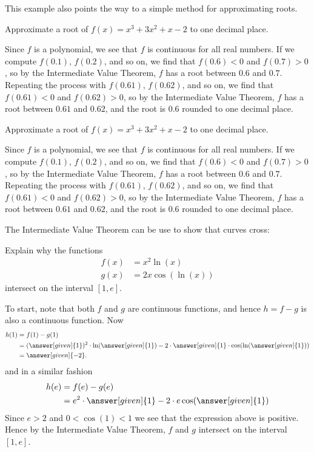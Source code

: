 \documentclass{ximera}
\begin{document}
This example also points the way to a simple method for approximating
roots. 

\begin{example} 
Approximate a root of $f(x) =x^3 + 3x^2+x-2$ to one decimal place.



Since $f$ is a polynomial, we see that $f$ is continuous for all real
numbers. If we compute $f(0.1)$, $f(0.2)$, and so on, we find that
$f(0.6)<0$ and $f(0.7)>0$, so by the Intermediate Value Theorem, $f$
has a root between $0.6$ and $0.7$. Repeating the process with
$f(0.61)$, $f(0.62)$, and so on, we find that $f(0.61)<0$ and
$f(0.62)>0$, so by the Intermediate Value Theorem, $f$ has a root between $0.61$ and
$0.62$, and the root is $0.6$ rounded to one decimal place.
\end{example}


\begin{example} 
Approximate a root of $f(x) =x^3 + 3x^2+x-2$ to one decimal place.



Since $f$ is a polynomial, we see that $f$ is continuous for all real
numbers. If we compute $f(0.1)$, $f(0.2)$, and so on, we find that
$f(0.6)<0$ and $f(0.7)>0$, so by the Intermediate Value Theorem, $f$
has a root between $0.6$ and $0.7$. Repeating the process with
$f(0.61)$, $f(0.62)$, and so on, we find that $f(0.61)<0$ and
$f(0.62)>0$, so by the Intermediate Value Theorem, $f$ has a root between $0.61$ and
$0.62$, and the root is $0.6$ rounded to one decimal place.
\end{example}


The Intermediate Value Theorem can be use to show that curves cross:


\begin{example} 
  Explain why the functions
  \begin{align*}
    f(x) &= x^2\ln(x)\\
    g(x) &= 2x\cos(\ln(x))
  \end{align*}
  intersect on the interval $[1,e]$.

  To start, note that both $f$ and $g$ are continuous functions, and
  hence $h = f-g$ is also a continuous function. Now
  \begin{align*}
    h(1) &= f(1) - g(1) \\
    &= (\answer[given]{1})^2\cdot \ln(\answer[given]{1}) - 2\cdot\answer[given]{1}\cdot \cos(\ln(\answer[given]{1}))\\
    &= \answer[given]{-2}.
  \end{align*}
  and in a similar fashion
   \begin{align*}
    h(e) &= f(e) - g(e) \\
    &= e^2\cdot \answer[given]{1} - 2\cdot e\cos(\answer[given]{1})
   \end{align*}
   Since $e>2$ and $0 < \cos(1)<1$ we see that the expression above is
   positive. Hence by the Intermediate Value Theorem, $f$ and $g$
   intersect on the interval $[1,e]$.
\end{example}
\end{document}

